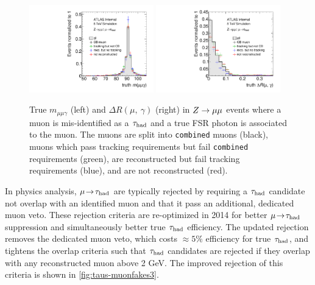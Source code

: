 \begin{figure}[tp]
  \centering
  \includegraphics[width=0.48\textwidth]{figures/tauperformance/muonfakes_mlly}
  \includegraphics[width=0.48\textwidth]{figures/tauperformance/muonfakes_dR}
  \caption{True $m_{\mu\mu\gamma}$ (left) and $\Delta R(\mu,\ \gamma)$ (right) in $Z \rightarrow \mu\mu$ events where a muon is mis-identified as a $\tau_\text{had}$ and a true FSR photon is associated to the muon. The muons are split into \texttt{combined} muons (black), muons which pass tracking requirements but fail \texttt{combined} requirements (green), are reconstructed but fail tracking requirements (blue), and are not reconstructed (red).}
  \label{fig:taus-muonfakes-2}
\end{figure}

In physics analysis, $\mu \!\rightarrow\!\tau_\text{had}$ are typically rejected by requiring a $\tau_\text{had}$ candidate not overlap with an identified muon and that it pass an additional, dedicated muon veto. These rejection criteria are re-optimized in 2014 for better $\mu \!\rightarrow\!\tau_\text{had}$ suppression and simultaneously better true $\tau_\text{had}$ efficiency. The updated rejection removes the dedicated muon veto, which costs $\approx\!5\%$ efficiency for true $\tau_\text{had}$, and tightens the overlap criteria such that $\tau_\text{had}$ candidates are rejected if they overlap with any reconstructed muon above 2 GeV. The improved rejection of this criteria is shown in \cref{fig:taus-muonfakes3}.


